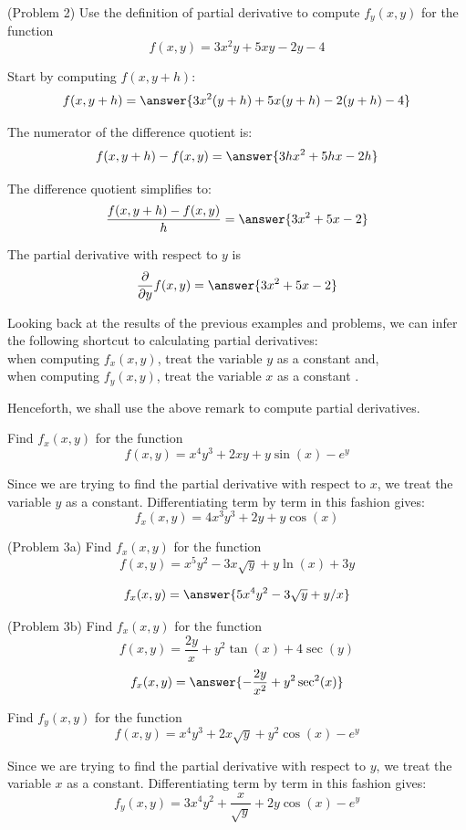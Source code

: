 \documentclass[handout]{ximera}
\begin{document}
\begin{problem}(Problem 2)
Use the definition of partial derivative to compute $f_y(x,y)$ for the function
\[
f(x,y) = 3x^2y + 5xy - 2y - 4
\]

Start by computing $f(x, y+h)$:
\[
f(x, y+h) = \answer{3x^2(y+h) + 5x(y+h) - 2(y+h) - 4}
\]

The numerator of the difference quotient is:
\[
f(x,y+h) - f(x,y) = \answer{3hx^2 + 5hx - 2h}
\]

The difference quotient simplifies to:
\[
\frac{f(x,y+h) - f(x,y)}{h} = \answer{3x^2 + 5x -2}
\]

The partial derivative with respect to $y$ is
\[
\frac{\partial}{\partial y} f(x,y) = \answer{3x^2 + 5x -2}
\]
\end{problem}

\begin{remark}
Looking back at the results of the previous examples and problems, we can infer
the following shortcut to calculating partial derivatives: \\
when computing $f_x(x,y)$, treat the variable $y$ as a constant  and,\\
when computing $f_y(x,y)$, treat the variable $x$ as a constant .
\end{remark}

Henceforth, we shall use the above remark to compute partial derivatives.


\begin{example}[Example 3]
Find $f_x(x,y)$ for the function 
\[
f(x,y) = x^4y^3 + 2xy + y\sin(x) - e^y
\]

Since we are trying to find the partial derivative with respect to $x$, we treat 
the variable $y$ as a constant.
Differentiating term by term in this fashion gives:
\[
f_x(x,y) = 4x^3y^3 + 2y + y\cos(x)
\]
\end{example}

\begin{problem}(Problem 3a)
Find $f_x(x,y)$ for the function 
\[
f(x,y) = x^5y^2 - 3x\sqrt y + y\ln(x) + 3y
\]

\[
f_x(x,y) = \answer{5x^4y^2 - 3\sqrt y + y/x}
\]
\end{problem}

\begin{problem}(Problem 3b)
Find $f_x(x,y)$ for the function 
\[
f(x,y) = \frac{2y}{x} + y^2\tan(x) + 4\sec(y)
\]
\[
f_x(x,y) = \answer{-\frac{2y}{x^2} + y^2\sec^2(x)}
\]
\end{problem}


\begin{example}[Example 4]
Find $f_y(x,y)$ for the function 
\[
f(x,y) = x^4y^3 + 2x\sqrt{y} + y^2\cos(x) - e^y
\]

Since we are trying to find the partial derivative with respect to $y$, we treat 
the variable $x$ as a constant.
Differentiating term by term in this fashion gives:
\[
f_y(x,y) = 3x^4y^2 + \frac{x}{\sqrt{y}} + 2y\cos(x) - e^y
\]
\end{example}
\end{document}
